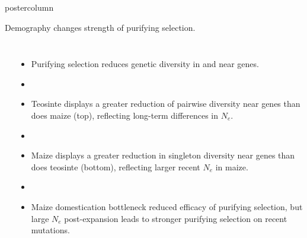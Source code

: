 \documentclass[final]{beamer}
\begin{document}
\begin{frame}
\begin{columns}
\begin{column}{.49\textwidth}
\begin{beamercolorbox}[center,wd=\textwidth]{postercolumn}
\begin{minipage}[T]{.95\textwidth}
{\begin{block}{Demography changes strength of purifying selection.}
              \begin{columns}
              \centering
              \\
              \begin{itemize}
                \item Purifying selection reduces genetic diversity in
                  and near genes.
                \item[]
                \item Teosinte displays a greater reduction of pairwise diversity near
                  genes than does maize (top), reflecting long-term differences in $N_e$.
                \item[]
                \item Maize displays a greater reduction in singleton
                  diversity near genes than does teosinte (bottom), reflecting larger recent $N_e$ in maize.
                \item[]
                \item Maize domestication bottleneck reduced efficacy of purifying selection, but large $N_e$ post-expansion leads to stronger purifying selection on recent mutations.  %

\end{itemize}
\end{columns}
\end{block}}
\end{minipage}
\end{beamercolorbox}
\end{column}
\end{columns}
\end{frame}
\end{document}
